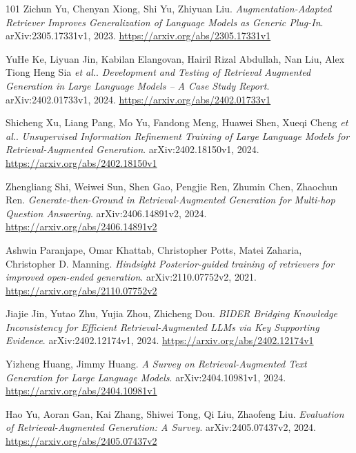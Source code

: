 \documentclass[11pt,a4paper]{article}
\begin{document}
\begin{thebibliography}{101}
Zichun Yu, Chenyan Xiong, Shi Yu, Zhiyuan Liu.
\newblock \emph{Augmentation-Adapted Retriever Improves Generalization of Language Models as Generic Plug-In}.
\newblock arXiv:2305.17331v1, 2023.
\newblock \url{https://arxiv.org/abs/2305.17331v1}

YuHe Ke, Liyuan Jin, Kabilan Elangovan, Hairil Rizal Abdullah, Nan Liu, Alex Tiong Heng Sia \emph{et al.}.
\newblock \emph{Development and Testing of Retrieval Augmented Generation in Large Language Models -- A Case Study Report}.
\newblock arXiv:2402.01733v1, 2024.
\newblock \url{https://arxiv.org/abs/2402.01733v1}

Shicheng Xu, Liang Pang, Mo Yu, Fandong Meng, Huawei Shen, Xueqi Cheng \emph{et al.}.
\newblock \emph{Unsupervised Information Refinement Training of Large Language Models for Retrieval-Augmented Generation}.
\newblock arXiv:2402.18150v1, 2024.
\newblock \url{https://arxiv.org/abs/2402.18150v1}

Zhengliang Shi, Weiwei Sun, Shen Gao, Pengjie Ren, Zhumin Chen, Zhaochun Ren.
\newblock \emph{Generate-then-Ground in Retrieval-Augmented Generation for Multi-hop Question Answering}.
\newblock arXiv:2406.14891v2, 2024.
\newblock \url{https://arxiv.org/abs/2406.14891v2}

Ashwin Paranjape, Omar Khattab, Christopher Potts, Matei Zaharia, Christopher D. Manning.
\newblock \emph{Hindsight Posterior-guided training of retrievers for improved open-ended generation}.
\newblock arXiv:2110.07752v2, 2021.
\newblock \url{https://arxiv.org/abs/2110.07752v2}

Jiajie Jin, Yutao Zhu, Yujia Zhou, Zhicheng Dou.
\newblock \emph{BIDER Bridging Knowledge Inconsistency for Efficient Retrieval-Augmented LLMs via Key Supporting Evidence}.
\newblock arXiv:2402.12174v1, 2024.
\newblock \url{https://arxiv.org/abs/2402.12174v1}

Yizheng Huang, Jimmy Huang.
\newblock \emph{A Survey on Retrieval-Augmented Text Generation for Large Language Models}.
\newblock arXiv:2404.10981v1, 2024.
\newblock \url{https://arxiv.org/abs/2404.10981v1}

Hao Yu, Aoran Gan, Kai Zhang, Shiwei Tong, Qi Liu, Zhaofeng Liu.
\newblock \emph{Evaluation of Retrieval-Augmented Generation: A Survey}.
\newblock arXiv:2405.07437v2, 2024.
\newblock \url{https://arxiv.org/abs/2405.07437v2}


\end{thebibliography}
\end{document}
